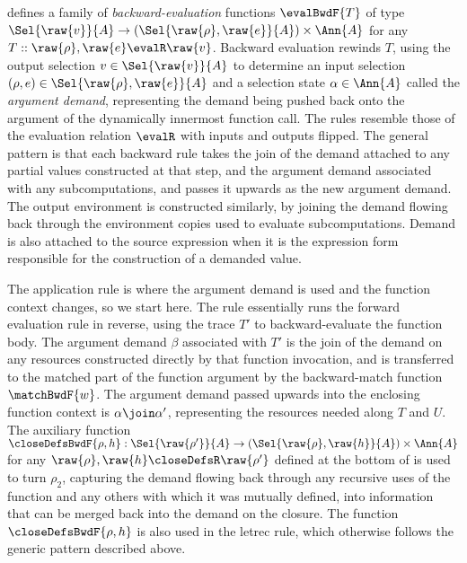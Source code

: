  defines a family of \emph{backward-evaluation} functions $\evalBwdF{T}$ of type $\Sel{\raw{v}}{A} \to (\Sel{\raw{\rho}, \raw{e}}{A}) \times \Ann{A}$ for any $T :: \raw{\rho}, \raw{e} \evalR \raw{v}$. Backward evaluation rewinds $T$, using the output selection $v \in \Sel{\raw{v}}{A}$ to determine an input selection $(\rho, e) \in \Sel{\raw{\rho}, \raw{e}}{A}$ and a selection state $\alpha \in \Ann{A}$ called the \emph{argument demand}, representing the demand being pushed back onto the argument of the dynamically innermost function call. The rules resemble those of the evaluation relation $\evalR$ with inputs and outputs flipped. The general pattern is that each backward rule takes the join of the demand attached to any partial values constructed at that step, and the argument demand associated with any subcomputations, and passes it upwards as the new argument demand. The output environment is constructed similarly, by joining the demand flowing back through the environment copies used to evaluate subcomputations. Demand is also attached to the source expression when it is the expression form responsible for the construction of a demanded value.



 The application rule is where the argument demand is used and the function context changes, so we start here. The rule essentially runs the forward evaluation rule in reverse, using the trace $T'$ to backward-evaluate the function body. The argument demand $\beta$ associated with $T'$ is the join of the demand on any resources constructed directly by that function invocation, and is transferred to the matched part of the function argument by the backward-match function $\matchBwdF{w}$. The argument demand passed upwards into the enclosing function context is $\alpha \join \alpha'$, representing the resources needed along $T$ and $U$. The auxiliary function $\smash{\closeDefsBwdF{\rho, h}}: \smash{\Sel{\raw{\rho'}}{A} \to (\Sel{\raw{\rho}, \raw{h}}{A})} \times \Ann{A}$ for any $\raw{\rho}, \raw{h} \closeDefsR \raw{\rho'}$ defined at the bottom of  is used to turn $\rho_2$, capturing the demand flowing back through any recursive uses of the function and any others with which it was mutually defined, into information that can be merged back into the demand on the closure. The function $\closeDefsBwdF{\rho,h}$ is also used in the letrec rule, which otherwise follows the generic pattern described above.


